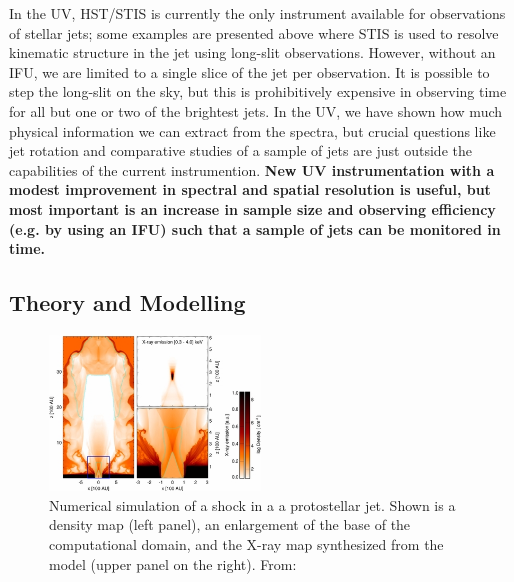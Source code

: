 \documentclass[12pt]{article}
\begin{document}
In the UV, HST/STIS is currently the only instrument available for observations of stellar jets; some examples are presented above where STIS is used to resolve kinematic structure in the jet using long-slit observations. However, without an IFU, we are limited to a single slice of the jet per observation. It is possible to step the long-slit on the sky, but this is prohibitively expensive in observing time for all but one or two of the brightest jets. In the UV, we have shown how much physical information we can extract from the spectra, but crucial questions like jet rotation and comparative studies of a sample of jets are just outside the capabilities of the current instrumention. \textbf{New UV instrumentation with a modest improvement in spectral and spatial resolution is useful, but most important is an increase in sample size and observing efficiency (e.g. by using an IFU) such that a sample of jets can be monitored in time. }

\subsection{Theory and Modelling}
\begin{figure}[htb]
\centering
\includegraphics[width=0.5\textwidth]{apj395310f4_lr.jpg}
\caption{Numerical simulation of a shock in a a protostellar jet. Shown is a density map (left panel), an enlargement of the base of the computational domain, and the X-ray map synthesized from the model (upper panel on the right).  From:}
\label{fig:sims}
\end{figure}
\end{document}
